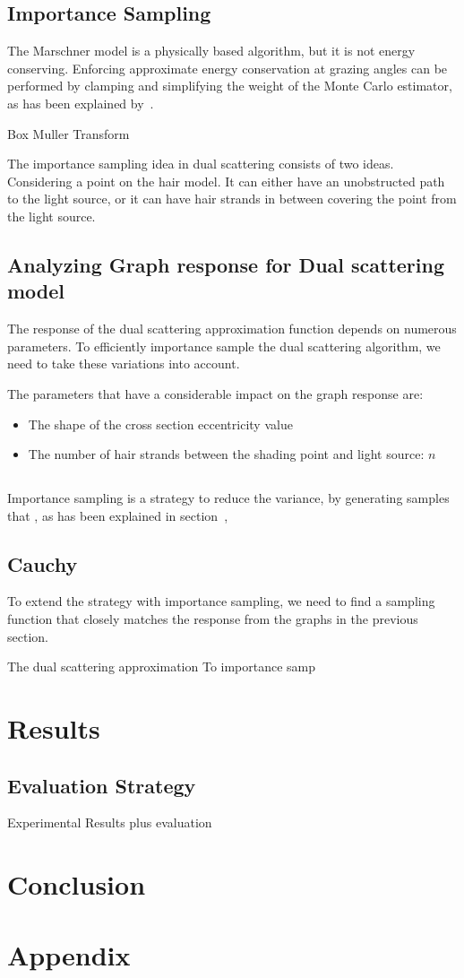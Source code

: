 \documentclass[11pt,a4paper]{report}
\begin{document}
\section{Importance Sampling}
The Marschner model is a physically based algorithm, but it is not energy conserving. Enforcing approximate energy conservation at grazing angles can be performed by clamping and simplifying the weight of the Monte Carlo estimator, as has been explained by~\cite{hery}.

Box Muller Transform

The importance sampling idea in dual scattering consists of two ideas. Considering a point on the hair model. It can either have an unobstructed path to the light source, or it can have hair strands in between covering the point from the light source.

\section{Analyzing Graph response for Dual scattering model}

The response of the dual scattering approximation function depends on numerous parameters. To efficiently importance sample the dual scattering algorithm, we need to take these variations into account.

The parameters that have a considerable impact on the graph response are:
\begin{itemize}
\item The shape of the cross section eccentricity value
\item The number of hair strands between the shading point and light source: $n$
\end{itemize}

\section{}
Importance sampling is a strategy to reduce the variance, by generating samples that , as has been explained in section~\label{importance_sampling},

\section{Cauchy}

To extend the strategy with importance sampling, we need to find a sampling function that closely matches the response from the graphs in the previous section.


The dual scattering approximation To importance samp


\chapter{Results}

\section{Evaluation Strategy}

Experimental Results plus evaluation

\chapter{Conclusion}

\chapter{Appendix}



\end{document}
